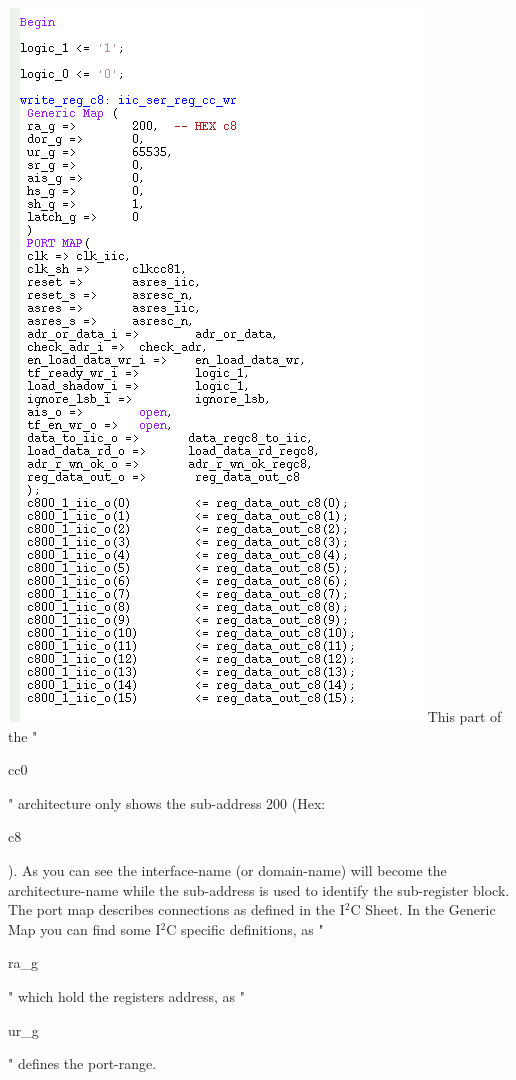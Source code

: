 \documentclass[a4paper,12pt]{report}
\begin{document}
\newline
\includegraphics[scale=0.9]{images/FRCA_part1_arch.png}\newline
This part of the "\begin{tt}cc0\end{tt}" architecture only shows the sub-address 200 (Hex: \begin{tt}c8\end{tt}). As you can see the interface-name (or domain-name) will become the architecture-name while the sub-address is used to identify the sub-register block. The port map describes connections as defined in the I$^2$C Sheet. In the Generic Map you can find some I$^2$C specific definitions, as "\begin{tt}ra\_g\end{tt}" which hold the registers address, as "\begin{tt}ur\_g\end{tt}" defines the port-range.
\end{document}
